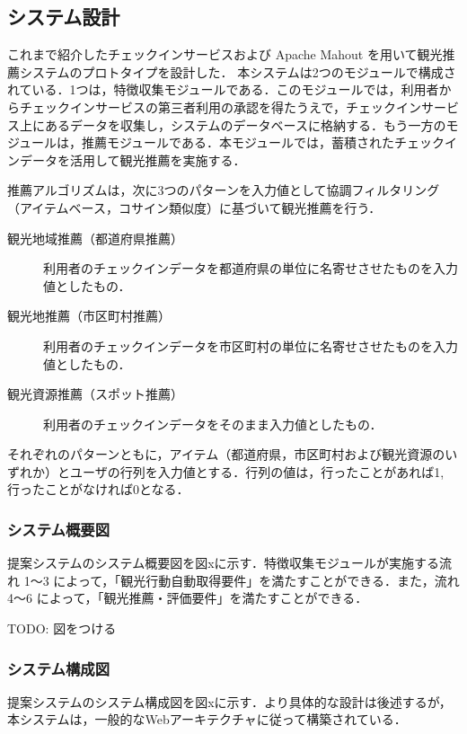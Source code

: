 \documentclass{jsarticle}
\begin{document}
\subsection{システム設計}

これまで紹介したチェックインサービスおよび Apache Mahout を用いて観光推薦システムのプロトタイプを設計した．
本システムは2つのモジュールで構成されている．1つは，特徴収集モジュールである．このモジュールでは，利用者からチェックインサービスの第三者利用の承認を得たうえで，チェックインサービス上にあるデータを収集し，システムのデータベースに格納する．もう一方のモジュールは，推薦モジュールである．本モジュールでは，蓄積されたチェックインデータを活用して観光推薦を実施する．

推薦アルゴリズムは，次に3つのパターンを入力値として協調フィルタリング（アイテムベース，コサイン類似度）に基づいて観光推薦を行う．

\begin{description}
\item[観光地域推薦（都道府県推薦）] 利用者のチェックインデータを都道府県の単位に名寄せさせたものを入力値としたもの．
\item[観光地推薦（市区町村推薦）] 利用者のチェックインデータを市区町村の単位に名寄せさせたものを入力値としたもの．
\item[観光資源推薦（スポット推薦）] 利用者のチェックインデータをそのまま入力値としたもの．
\end{description}


それぞれのパターンともに，アイテム（都道府県，市区町村および観光資源のいずれか）とユーザの行列を入力値とする．行列の値は，行ったことがあれば1, 行ったことがなければ0となる．

\subsubsection{システム概要図}

提案システムのシステム概要図を図xに示す．特徴収集モジュールが実施する流れ 1〜3 によって，「観光行動自動取得要件」を満たすことができる．また，流れ 4〜6 によって，「観光推薦・評価要件」を満たすことができる．

TODO: 図をつける

\subsubsection{システム構成図}

提案システムのシステム構成図を図xに示す．より具体的な設計は後述するが，本システムは，一般的なWebアーキテクチャに従って構築されている．
\end{document}
